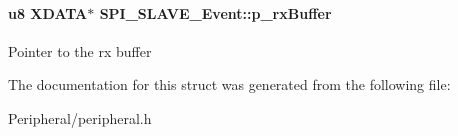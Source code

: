\paragraph[{\texorpdfstring{p\+\_\+rx\+Buffer}{p_rxBuffer}}]{\setlength{\rightskip}{0pt plus 5cm}u8 X\+D\+A\+TA$\ast$ S\+P\+I\+\_\+\+S\+L\+A\+V\+E\+\_\+\+Event\+::p\+\_\+rx\+Buffer}\hypertarget{struct_s_p_i___s_l_a_v_e___event_a67b8df0c859d79c98a8d1a6f1ad96553}{}\label{struct_s_p_i___s_l_a_v_e___event_a67b8df0c859d79c98a8d1a6f1ad96553}
Pointer to the rx buffer 

The documentation for this struct was generated from the following file\+:\begin{DoxyCompactItemize}
\item 
Peripheral/peripheral.\+h\end{DoxyCompactItemize}
